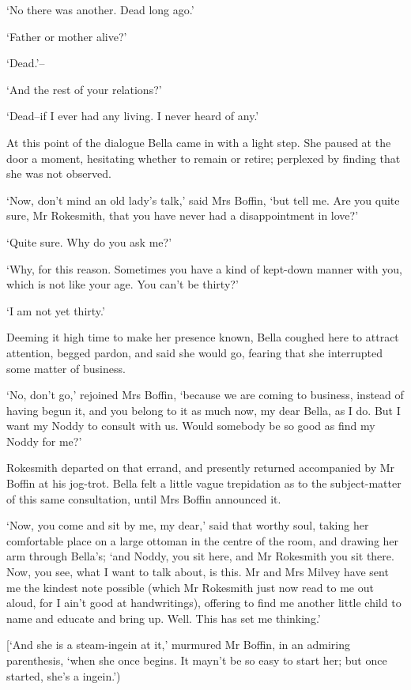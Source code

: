 ‘No there was another. Dead long ago.’

‘Father or mother alive?’

‘Dead.’--

‘And the rest of your relations?’

‘Dead--if I ever had any living. I never heard of any.’

At this point of the dialogue Bella came in with a light step. She
paused at the door a moment, hesitating whether to remain or retire;
perplexed by finding that she was not observed.

‘Now, don’t mind an old lady’s talk,’ said Mrs Boffin, ‘but tell me. Are
you quite sure, Mr Rokesmith, that you have never had a disappointment
in love?’

‘Quite sure. Why do you ask me?’

‘Why, for this reason. Sometimes you have a kind of kept-down manner
with you, which is not like your age. You can’t be thirty?’

‘I am not yet thirty.’

Deeming it high time to make her presence known, Bella coughed here to
attract attention, begged pardon, and said she would go, fearing that
she interrupted some matter of business.

‘No, don’t go,’ rejoined Mrs Boffin, ‘because we are coming to business,
instead of having begun it, and you belong to it as much now, my dear
Bella, as I do. But I want my Noddy to consult with us. Would somebody
be so good as find my Noddy for me?’

Rokesmith departed on that errand, and presently returned accompanied by
Mr Boffin at his jog-trot. Bella felt a little vague trepidation as to
the subject-matter of this same consultation, until Mrs Boffin announced
it.

‘Now, you come and sit by me, my dear,’ said that worthy soul, taking
her comfortable place on a large ottoman in the centre of the room,
and drawing her arm through Bella’s; ‘and Noddy, you sit here, and Mr
Rokesmith you sit there. Now, you see, what I want to talk about, is
this. Mr and Mrs Milvey have sent me the kindest note possible (which
Mr Rokesmith just now read to me out aloud, for I ain’t good at
handwritings), offering to find me another little child to name and
educate and bring up. Well. This has set me thinking.’

[‘And she is a steam-ingein at it,’ murmured Mr Boffin, in an admiring
parenthesis, ‘when she once begins. It mayn’t be so easy to start her;
but once started, she’s a ingein.’)

